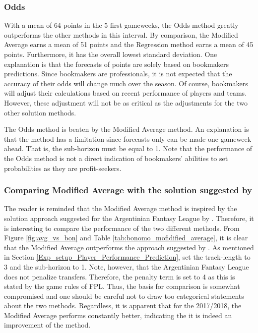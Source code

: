 \subsubsection{Odds}

With a mean of 64 points in the 5 first gameweeks, the Odds method greatly outperforms the other methods in this interval. By comparison, the Modified Average earns a mean of 51 points and the Regression method earns a mean of 45 points. Furthermore, it has the overall lowest standard deviation. One explanation is that the forecasts of points are solely based on bookmakers predictions. Since bookmakers are professionals, it is not expected that the accuracy of their odds will change much over the season. Of course, bookmakers will adjust their calculations based on recent performance of players and teams. However, these adjustment will not be as critical as the adjustments for the two other solution methods. 

\newpar

The Odds method is beaten by the Modified Average method. An explanation is that the method has a limitation since forecasts only can be made one gameweek ahead. That is, the sub-horizon must be equal to 1. Note that the performance of the Odds method is not a direct indication of bookmakers' abilities to set probabilities as they are profit-seekers. 


\subsubsection{Comparing Modified Average with the solution suggested by \cite{Bonomo}}



The reader is reminded that the Modified Average method is inspired by the solution approach suggested for the Argentinian Fantasy League by \cite{Bonomo}. Therefore, it is interesting to compare the performance of the two different methods. From Figure \ref{fig:avg_vs_bon} and Table \ref{tab:bonomo_mofidified_average}, it is clear that the Modified Average outperforms the approach suggested by \cite{Bonomo}. As mentioned in Section \ref{Exp_setup_Player_Performance_Prediction}, \cite{Bonomo} set the track-length to 3 and the sub-horizon to 1. Note, however, that the Argentinian Fantasy League does not penalize transfers. Therefore, the penalty term is set to 4 as this is stated by the game rules of FPL. Thus, the basis for comparison is somewhat compromised and one should be careful not to draw too categorical statements about the two methods. Regardless, it is apparent that for the 2017/2018, the Modified Average performs constantly better, indicating the it is indeed an improvement of the method.

